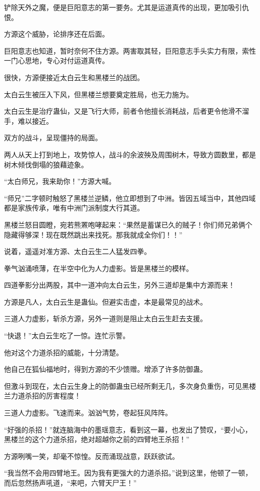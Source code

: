 \begin{this_body}
铲除天外之魔，便是巨阳意志的第一要务。尤其是运道真传的出现，更加吸引仇恨。

方源这个威胁，论排序还在后面。

巨阳意志也知道，暂时奈何不住方源。两害取其轻，巨阳意志手头实力有限，索性一门心思地，专心对付运道真传。

很快，方源便接近太白云生和黑楼兰的战团。

太白云生被压入下风，但黑楼兰想要奠定胜局，也无力施为。

太白云生是治疗蛊仙，又是飞行大师，前者令他擅长消耗战，后者更令他滑不溜手，难以接近。

双方的战斗，呈现僵持的局面。

两人从天上打到地上，攻势惊人，战斗的余波殃及周围树木，导致方圆数里，都是树木倾伐倒塌的狼藉迹象。

“太白师兄，我来助你！”方源大喊。

“师兄”二字顿时触怒了黑楼兰逆鳞，他立即想到了中洲。皆因五域当中，其他四域都是家族传承，唯有中洲门派制度大行其道。

黑楼兰怒目圆瞪，宛若熊罴咆哮起来：“果然是蓄谋已久的贼子！你们师兄弟俩个隐藏得够深！现在既然跳出来找死。那我就成全你们！！”

说着，遥遥对准方源、太白云生二人猛发四拳。

拳气汹涌喷薄，在半空中化为人力虚影。皆是黑楼兰的模样。

四道拳影分出两股，其中一道冲向太白云生，另外三道却是集中方源而来！

方源是凡人，太白云生是蛊仙。但避实击虚，本是最常见的战术。

三道人力虚影，斩杀方源，另外一道则是阻止太白云生赶去支援。

“快退！”太白云生吃了一惊。连忙示警。

他对这个力道杀招的威能，十分清楚。

他自己在狐仙福地时，得到方源的不少馈赠。增添了许多防御蛊。

但激斗到现在，太白云生身上的防御蛊虫已经所剩无几，多次身负重伤，可见黑楼兰力道杀招的厉害程度！

三道人力虚影。飞速而来。汹汹气势，卷起狂风阵阵。

“好强的杀招！”就连脑海中的墨瑶意志，看到这一幕，也发出了赞叹，“要小心，黑楼兰的这个力道杀招，绝对超越你之前的四臂地王杀招！”

方源咧嘴一笑，却毫不惊惶。反而涌现战意，跃跃欲试。

“我当然不会用四臂地王。因为我有更强大的力道杀招。”说到这里，他顿了一顿，而后忽然扬声吼道，“来吧，六臂天尸王！”


\end{this_body}
